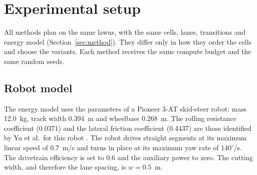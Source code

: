 
\section{Experimental setup}
\label{sec:experimental-setup}

%

All methods plan on the same lawns, with the same cells, lanes, transitions and energy model (Section~\ref{sec:method}).
They differ only in how they order the cells and choose the variants.
Each method receives the same compute budget and the same random seeds.

\subsection{Robot model}
\label{sec:setup-robot}

The energy model uses the parameters of a Pioneer 3-AT skid-steer robot: mass 12.0~kg, track width 0.394~m and wheelbase 0.268~m.
The rolling resistance coefficient (0.0371) and the lateral friction coefficient (0.4437) are those identified by Yu et al.\ for this robot \cite{yuDynamicModelingSkidsteered2009}.
The robot drives straight segments at its maximum linear speed of 0.7~m/s and turns in place at its maximum yaw rate of $140^\circ$/s.
The drivetrain efficiency is set to 0.6 and the auxiliary power to zero.
The cutting width, and therefore the lane spacing, is $w = 0.5$~m.

